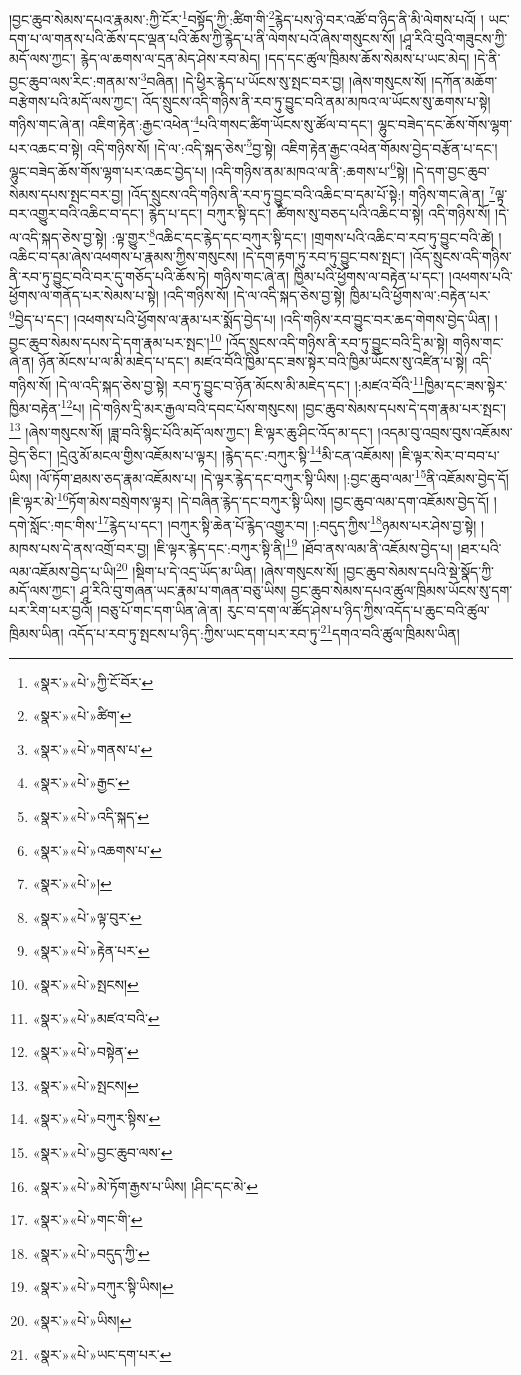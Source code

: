 །བྱང་ཆུབ་སེམས་དཔའ་རྣམས་:ཀྱི་ངོར་\footnote{«སྣར་»«པེ་»ཀྱི་ངོ་བོར་}བསྟོད་ཀྱི་:ཚིག་གི་\footnote{«སྣར་»«པེ་»ཚིག་}རྙེད་པས་ཉེ་བར་འཚོ་བ་ཉིད་ནི་མི་ལེགས་པའོ། །
ཡང་དག་པ་ལ་གནས་པའི་ཆོས་དང་ལྡན་པའི་ཆོས་ཀྱི་རྙེད་པ་ནི་ལེགས་པའོ་ཞེས་གསུངས་སོ། །ཤཱ་རིའི་བུའི་གཟུངས་ཀྱི་མདོ་ལས་ཀྱང་། རྙེད་ལ་ཆགས་ལ་དྲན་མེད་ཤེས་རབ་མེད། །དད་དང་ཚུལ་ཁྲིམས་ཆོས་སེམས་པ་ཡང་མེད། །དེ་ནི་བྱང་ཆུབ་ལས་རིང་:གནམ་ས་\footnote{«སྣར་»«པེ་»གནས་པ་}བཞིན། །དེ་ཕྱིར་རྙེད་པ་ཡོངས་སུ་སྤང་བར་བྱ། །ཞེས་གསུངས་སོ། །དཀོན་མཆོག་བརྩེགས་པའི་མདོ་ལས་ཀྱང་། འོད་སྲུངས་འདི་གཉིས་ནི་རབ་ཏུ་བྱུང་བའི་ནམ་མཁའ་ལ་ཡོངས་སུ་ཆགས་པ་སྟེ། གཉིས་གང་ཞེ་ན། འཇིག་རྟེན་:རྒྱང་འཕེན་\footnote{«སྣར་»«པེ་»རྒྱང་}པའི་གསང་ཚིག་ཡོངས་སུ་ཚོལ་བ་དང་། ལྷུང་བཟེད་དང་ཆོས་གོས་ལྷག་པར་འཆང་བ་སྟེ། འདི་གཉིས་སོ། །དེ་ལ་:འདི་སྐད་ཅེས་\footnote{«སྣར་»«པེ་»འདི་སྐད་}བྱ་སྟེ། འཇིག་རྟེན་རྒྱང་འཕེན་གོམས་བྱེད་བརྩོན་པ་དང་། ལྷུང་བཟེད་ཆོས་གོས་ལྷག་པར་འཆང་བྱེད་པ། །འདི་གཉིས་ནམ་མཁའ་ལ་ནི་:ཆགས་པ་\footnote{«སྣར་»«པེ་»འཆགས་པ་}སྟེ། །དེ་དག་བྱང་ཆུབ་སེམས་དཔས་སྤང་བར་བྱ། །འོད་སྲུངས་འདི་གཉིས་ནི་རབ་ཏུ་བྱུང་བའི་འཆིང་བ་དམ་པོ་སྟེ:། གཉིས་གང་ཞེ་ན། \footnote{«སྣར་»«པེ་»།  }ལྟ་བར་འགྱུར་བའི་འཆིང་བ་དང་། རྙེད་པ་དང་། བཀུར་སྟི་དང་། ཚིགས་སུ་བཅད་པའི་འཆིང་བ་སྟེ། འདི་གཉིས་སོ། །དེ་ལ་འདི་སྐད་ཅེས་བྱ་སྟེ། :ལྟ་གྱུར་\footnote{«སྣར་»«པེ་»ལྟ་བུར་}འཆིང་དང་རྙེད་དང་བཀུར་སྟི་དང་། །གྲགས་པའི་འཆིང་བ་རབ་ཏུ་བྱུང་བའི་ཚེ། །འཆིང་བ་དམ་ཞེས་འཕགས་པ་རྣམས་ཀྱིས་གསུངས། །དེ་དག་རྟག་ཏུ་རབ་ཏུ་བྱུང་བས་སྤང་། །འོད་སྲུངས་འདི་གཉིས་ནི་རབ་ཏུ་བྱུང་བའི་བར་དུ་གཅོད་པའི་ཆོས་ཏེ། གཉིས་གང་ཞེ་ན། ཁྱིམ་པའི་ཕྱོགས་ལ་བརྟེན་པ་དང་། །འཕགས་པའི་ཕྱོགས་ལ་གནོད་པར་སེམས་པ་སྟེ། །འདི་གཉིས་སོ། །དེ་ལ་འདི་སྐད་ཅེས་བྱ་སྟེ། ཁྱིམ་པའི་ཕྱོགས་ལ་:བརྟེན་པར་\footnote{«སྣར་»«པེ་»རྟེན་པར་}བྱེད་པ་དང་། །འཕགས་པའི་ཕྱོགས་ལ་རྣམ་པར་སྨོད་བྱེད་པ། །འདི་གཉིས་རབ་བྱུང་བར་ཆད་གེགས་བྱེད་ཡིན། །བྱང་ཆུབ་སེམས་དཔས་དེ་དག་རྣམ་པར་སྤང་།\footnote{«སྣར་»«པེ་»སྤངས།} །འོད་སྲུངས་འདི་གཉིས་ནི་རབ་ཏུ་བྱུང་བའི་དྲི་མ་སྟེ། གཉིས་གང་ཞེ་ན། ཉོན་མོངས་པ་ལ་མི་མཇེད་པ་དང་། མཛའ་བོའི་ཁྱིམ་དང་ཟས་སྟེར་བའི་ཁྱིམ་ཡོངས་སུ་འཛིན་པ་སྟེ། འདི་གཉིས་སོ། །དེ་ལ་འདི་སྐད་ཅེས་བྱ་སྟེ། རབ་ཏུ་བྱུང་བ་ཉོན་མོངས་མི་མཇེད་དང་། །:མཛའ་བོའི་\footnote{«སྣར་»«པེ་»མཛའ་བའི་}ཁྱིམ་དང་ཟས་སྟེར་ཁྱིམ་བརྟེན་\footnote{«སྣར་»«པེ་»བསྟེན་}པ། །དེ་གཉིས་དྲི་མར་རྒྱལ་བའི་དབང་པོས་གསུངས། །བྱང་ཆུབ་སེམས་དཔས་དེ་དག་རྣམ་པར་སྤང་།\footnote{«སྣར་»«པེ་»སྤངས།} །ཞེས་གསུངས་སོ། །ཟླ་བའི་སྙིང་པོའི་མདོ་ལས་ཀྱང་། ཇི་ལྟར་ཆུ་ཤིང་འོད་མ་དང་། །འདམ་བུ་འབྲས་བུས་འཇོམས་བྱེད་ཅིང་། །དྲེའུ་མོ་མངལ་གྱིས་འཇོམས་པ་ལྟར། །རྙེད་དང་:བཀུར་སྟི་\footnote{«སྣར་»«པེ་»བཀུར་སྟིས་}མི་ངན་འཇོམས། །ཇི་ལྟར་སེར་བ་བབ་པ་ཡིས། །ལོ་ཏོག་ཐམས་ཅད་རྣམ་འཇོམས་པ། །དེ་ལྟར་རྙེད་དང་བཀུར་སྟི་ཡིས། །:བྱང་ཆུབ་ལམ་\footnote{«སྣར་»«པེ་»བྱང་ཆུབ་ལས་}ནི་འཇོམས་བྱེད་དོ། །ཇི་ལྟར་མེ་\footnote{«སྣར་»«པེ་»མེ་ཏོག་རྒྱས་པ་ཡིས། །ཤིང་དང་མེ་}ཏོག་མེས་བསྲེགས་ལྟར། །དེ་བཞིན་རྙེད་དང་བཀུར་སྟི་ཡིས། །བྱང་ཆུབ་ལམ་དག་འཇོམས་བྱེད་དོ། །དགེ་སློང་:གང་གིས་\footnote{«སྣར་»«པེ་»གང་གི་}རྙེད་པ་དང་། །བཀུར་སྟི་ཆེན་པོ་རྙེད་འགྱུར་བ། །:བདུད་ཀྱིས་\footnote{«སྣར་»«པེ་»བདུད་ཀྱི་}ཉམས་པར་ཤེས་བྱ་སྟེ། །མཁས་པས་དེ་ནས་འགྲོ་བར་བྱ། །ཇི་ལྟར་རྙེད་དང་:བཀུར་སྟི་ནི།\footnote{«སྣར་»«པེ་»བཀུར་སྟི་ཡིས།} །ཐོབ་ནས་ལམ་ནི་འཇོམས་བྱེད་པ། །ཐར་པའི་ལམ་འཇོམས་བྱེད་པ་ཡི།\footnote{«སྣར་»«པེ་»ཡིས།} །སྡིག་པ་དེ་འདྲ་ཡོད་མ་ཡིན། །ཞེས་གསུངས་སོ། །བྱང་ཆུབ་སེམས་དཔའི་སྡེ་སྣོད་ཀྱི་མདོ་ལས་ཀྱང་། ཤཱ་རིའི་བུ་གཞན་ཡང་རྣམ་པ་གཞན་བཅུ་ཡིས། བྱང་ཆུབ་སེམས་དཔའ་ཚུལ་ཁྲིམས་ཡོངས་སུ་དག་པར་རིག་པར་བྱའོ། །བཅུ་པོ་གང་དག་ཡིན་ཞེ་ན། རུང་བ་དག་ལ་ཚོད་ཤེས་པ་ཉིད་ཀྱིས་འདོད་པ་ཆུང་བའི་ཚུལ་ཁྲིམས་ཡིན། འདོད་པ་རབ་ཏུ་སྤངས་པ་ཉིད་:ཀྱིས་ཡང་དག་པར་རབ་ཏུ་\footnote{«སྣར་»«པེ་»ཡང་དག་པར་}དགའ་བའི་ཚུལ་ཁྲིམས་ཡིན། 